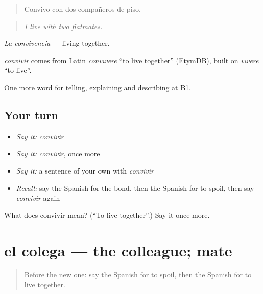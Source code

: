 \begin{quote}
Convivo con dos compañeros de piso.
\end{quote}

\begin{quote}
\emph{I live with two flatmates.}
\end{quote}

\emph{La convivencia} — living together.

\begin{cousinweb}
\emph{convivir} comes from Latin \emph{convīvere} \textquotedblleft{}to live together\textquotedblright{} (EtymDB), built on \emph{vīvere} \textquotedblleft{}to live\textquotedblright{}.
\end{cousinweb}

\begin{grammarlens}[title={What you've built}]
One more word for telling, explaining and describing at B1.
\end{grammarlens}

\subsection*{Your turn}
\begin{itemize}
\raggedright
  \item \emph{Say it:} \emph{convivir}
  \item \emph{Say it:} \emph{convivir}, once more
  \item \emph{Say it:} a sentence of your own with \emph{convivir}
  \item \emph{Recall:} say the Spanish for the bond, then the Spanish for to spoil, then say \emph{convivir} again
\end{itemize}

\begin{tcolorbox}[breakable,colback=teal!4,colframe=teal!35!black,title={Before you move on}]
What does convivir mean? (\textquotedblleft{}To live together\textquotedblright{}.) Say it once more.
\end{tcolorbox}
\section[el colega]{el colega — the colleague; mate}

\label{lesson:ES-C750-colega}



\begin{quote}
Before the new one: say the Spanish for to spoil, then the Spanish for to live together.
\end{quote}

